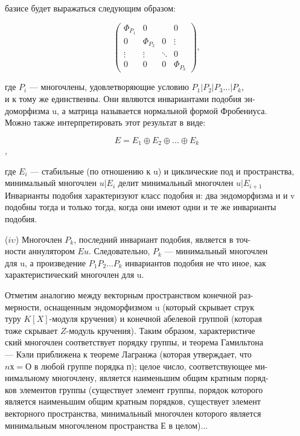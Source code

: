 \pagebreak

\noindent базисе будет выражаться следующим образом: 

$$\begin{pmatrix}
\Phi_{P_1} & 0 & \; & 0 \\
0 & \Phi_{P_2} & 0 & \vdots  \\
\vdots & \vdots & \ddots & 0  \\
0 & 0 & 0 & \Phi_{P_k} 
\end{pmatrix},
$$

\smallskip
 
\noindent где $P_i$ — многочлены, удовлетворяющие условию $P_1|P_2|P_3...|P_k$,\\ 
и к тому же единственны. Они являются инвариантами подобия 
эн-\\доморфизма u, а матрица называется нормальной формой Фробениуса.\\ 
Можно также интерпретировать этот результат в виде:


$$ E = E_1\oplus E_2\oplus...\oplus E_k $$,



\noindent где $E_i$ — стабильные (по отношению к u) и циклические под и 
пространства, минимальный многочлен $u|E_i$ делит минимальный 
многочлен $u|E_{i+1}$ Инварианты подобия характеризуют класс подобия и: два 
эндоморфизма и и v подобны тогда и только тогда, когда они имеют 
одни и те же инварианты подобия. 

\medskip

($\mathit{i} \upsilon $) Многочлен $P_k$, последний инвариант подобия, является в
точ-\\ности аннулятором $Eu$. Следовательно, $P_k$ — минимальный многочлен\\ 
для u, а произведение $P_1P_2... P_k$ инвариантов подобия не что иное, как 
характеристический многочлен для u. 


Отметим аналогию между векторным пространством конечной 
раз-\\мерности, оснащенным эндоморфизмом u (который скрывает 
струк\\туру $K[X]$-модуля кручения) и конечной абелевой группой (которая\\ 
тоже скрывает $Z$-модуль кручения). Таким образом, 
характеристиче\\ский многочлен соответствует порядку группы, и теорема Гамильтона\\ 
— Кэли приближена к теореме Лагранжа (которая утверждает, что\\ 
$nх = О$ в любой группе порядка п); целое число, соответствующее 
ми-\\нимальному многочлену, является наименьшим общим кратным 
поряд-\\ков элементов группы (существует элемент группы, порядок которого\\
является наименьшим общим кратным порядков, существует элемент\\ 
векторного пространства, минимальный многочлен которого является\\ 
минимальным многочленом пространства $Е$ в целом)...

